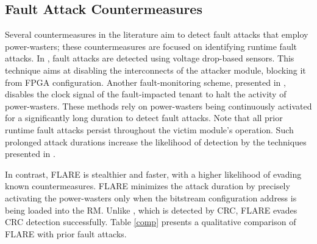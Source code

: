 \subsection{Fault Attack Countermeasures}
\vspace{-0.1cm}
Several countermeasures in the literature aim to detect fault attacks that employ power-wasters; these countermeasures are focused on identifying runtime fault attacks. In \cite{9643485}, fault attacks are detected using voltage drop-based sensors. This technique aims at disabling the interconnects of the attacker module, blocking it from FPGA configuration. Another fault-monitoring scheme, presented in \cite{10.1145/3451236}, disables the clock signal of the fault-impacted tenant to halt the activity of power-wasters. 
These methods rely on power-wasters being continuously activated for a significantly long duration to detect fault attacks. Note that all prior runtime fault attacks \cite{8056840, FPGAhammer, 7809042, 8844478} persist throughout the victim module's operation. Such prolonged attack durations increase the likelihood of detection by the techniques presented in \cite{9643485, 10.1145/3451236}. 

In contrast, FLARE is stealthier and faster, with a higher likelihood of evading known countermeasures. FLARE minimizes the attack duration by precisely activating the power-wasters only when the bitstream configuration address is being loaded into the RM. Unlike \cite{chaudhuri2024hackingfabrictargetingpartial}, which is detected by CRC, FLARE evades CRC detection successfully. 
Table \ref{comp} presents a qualitative comparison of FLARE with prior fault attacks.





